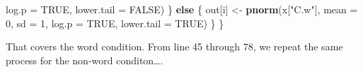 \documentclass[]{book}
\newenvironment{Shaded}{\begin{snugshade}}{\end{snugshade}}
\newcommand{\ControlFlowTok}[1]{\textcolor[rgb]{0.13,0.29,0.53}{\textbf{#1}}}
\newcommand{\DataTypeTok}[1]{\textcolor[rgb]{0.13,0.29,0.53}{#1}}
\newcommand{\DecValTok}[1]{\textcolor[rgb]{0.00,0.00,0.81}{#1}}
\newcommand{\KeywordTok}[1]{\textcolor[rgb]{0.13,0.29,0.53}{\textbf{#1}}}
\newcommand{\NormalTok}[1]{#1}
\newcommand{\OtherTok}[1]{\textcolor[rgb]{0.56,0.35,0.01}{#1}}
\newcommand{\StringTok}[1]{\textcolor[rgb]{0.31,0.60,0.02}{#1}}
\begin{document}
\begin{Shaded}
\begin{Highlighting}[numbers=left,,firstnumber=18,]
                       \DataTypeTok{log.p =} \OtherTok{TRUE}\NormalTok{, }\DataTypeTok{lower.tail =} \OtherTok{FALSE}\NormalTok{)}
\NormalTok{      \} }\ControlFlowTok{else}\NormalTok{ \{}
\NormalTok{        out[i] <-}\StringTok{ }\KeywordTok{pnorm}\NormalTok{(x[}\StringTok{"C.w"}\NormalTok{], }\DataTypeTok{mean =} \DecValTok{0}\NormalTok{, }\DataTypeTok{sd =} \DecValTok{1}\NormalTok{,}
                       \DataTypeTok{log.p =} \OtherTok{TRUE}\NormalTok{, }\DataTypeTok{lower.tail =} \OtherTok{TRUE}\NormalTok{)}
\NormalTok{        \}}
\NormalTok{      \}}
\end{Highlighting}
\end{Shaded}

That covers the word condition. From line 45 through 78, we repeat the same process for the non-word conditon\ldots{}.
\end{document}
